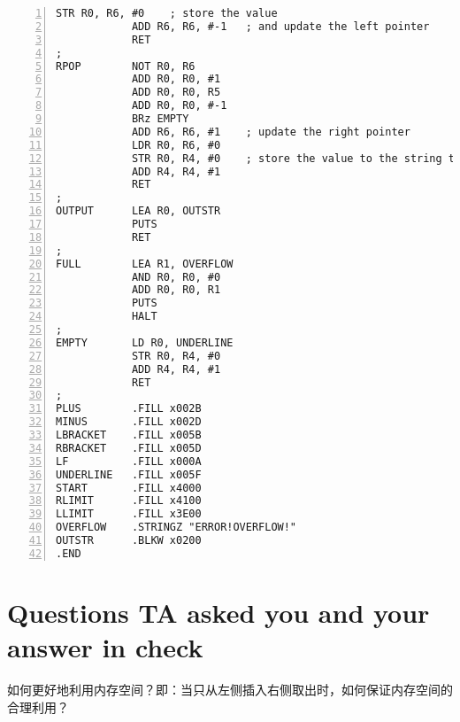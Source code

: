 \documentclass[a4paper, 12pt]{article}
\begin{document}
\begin{Verbatim}[frame = single, numbers = left, fontsize = \footnotesize]
            STR R0, R6, #0    ; store the value
            ADD R6, R6, #-1   ; and update the left pointer
            RET
;
RPOP        NOT R0, R6
            ADD R0, R0, #1
            ADD R0, R0, R5
            ADD R0, R0, #-1
            BRz EMPTY
            ADD R6, R6, #1    ; update the right pointer
            LDR R0, R6, #0
            STR R0, R4, #0    ; store the value to the string to be output
            ADD R4, R4, #1
            RET
;
OUTPUT      LEA R0, OUTSTR
            PUTS
            RET
;
FULL        LEA R1, OVERFLOW
            AND R0, R0, #0
            ADD R0, R0, R1
            PUTS
            HALT
;
EMPTY       LD R0, UNDERLINE
            STR R0, R4, #0
            ADD R4, R4, #1
            RET
;
PLUS        .FILL x002B
MINUS       .FILL x002D
LBRACKET    .FILL x005B
RBRACKET    .FILL x005D
LF          .FILL x000A
UNDERLINE   .FILL x005F
START       .FILL x4000
RLIMIT      .FILL x4100
LLIMIT      .FILL x3E00
OVERFLOW    .STRINGZ "ERROR!OVERFLOW!"
OUTSTR      .BLKW x0200
.END
\end{Verbatim}
\linespread{0.9}      %

\section{Questions TA asked you and your answer in check}
\noindent
如何更好地利用内存空间？即：当只从左侧插入右侧取出时，如何保证内存空间的合理利用？
\end{document}
